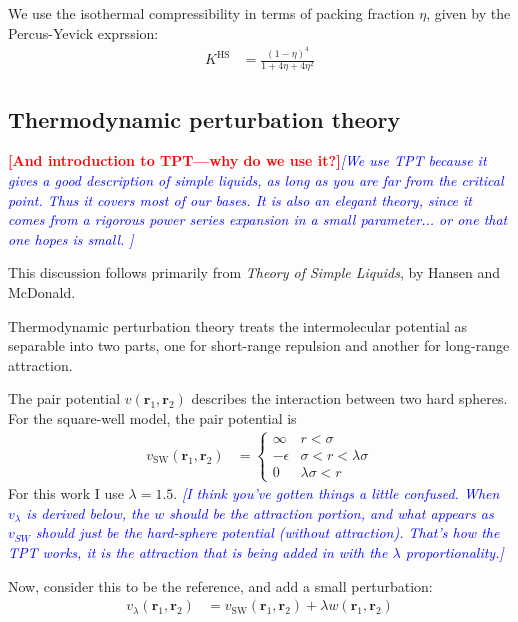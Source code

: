 \documentclass[letterpaper,twocolumn,amsmath,amssymb,prb]{revtex4-1}
\newcommand{\1}{\ensuremath{\textbf{r}_1}}
\newcommand{\2}{\ensuremath{\textbf{r}_2}}
\newcommand{\3}{\ensuremath{\textbf{r}_3}}
\newcommand{\4}{\ensuremath{\textbf{r}_4}}
\newcommand{\fixme}[1]{\textcolor{red}{\textbf{[#1]}}}
\newcommand{\davidsays}[1]{\textcolor{blue}{\textit{[#1]}}}
\begin{document}
We use the isothermal compressibility in terms of packing fraction $\eta$, given by the Percus-Yevick exprssion:\cite{Barker76}
\begin{align}
  K^\text{HS} &= \frac{\left(1 - \eta\right)^4}{1 + 4\eta + 4\eta^2}
\end{align}

\subsection{Thermodynamic perturbation theory}\label{subsec:TPT}


\fixme{And introduction to TPT---why do we use it?}\davidsays{We use
  TPT because it gives a good description of simple liquids, as long
  as you are far from the critical point.  Thus it covers most of our
  bases.  It is also an elegant theory, since it comes from a rigorous
  power series expansion in a small parameter... or one that one hopes
  is small. }

This discussion follows primarily from \textit{Theory of Simple Liquids}, by Hansen and McDonald\cite{Hansen06}.

Thermodynamic perturbation theory treats the intermolecular potential as separable into two parts, one for short-range repulsion and another for long-range attraction.

The pair potential $v(\1,\2)$ describes the interaction between two hard spheres. For the square-well model, the pair potential is
\begin{align}
  v_\text{SW}(\1,\2) &=
    \begin{cases}
      \infty & r < \sigma \\
      -\epsilon & \sigma < r < \lambda\sigma \\
      0 & \lambda\sigma < r
    \end{cases}
\end{align}
For this work I use $\lambda = 1.5$.  \davidsays{I think you've gotten
things a little confused.  When $v_\lambda$ is derived below, the $w$
should be the attraction portion, and what appears as $v_{SW}$ should
just be the hard-sphere potential (without attraction).  That's how
the TPT works, it is the attraction that is being added in with the
$\lambda$ proportionality.}

Now, consider this to be the reference, and add a small perturbation:
\begin{align}
  v_\lambda(\1,\2) &= v_\text{SW}(\1,\2) + \lambda w(\1,\2) \label{eqn:small-perturbation}
\end{align}
\end{document}
